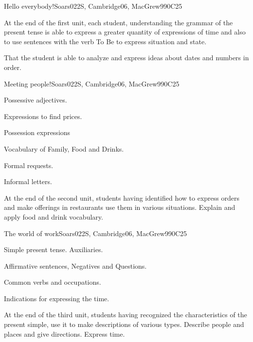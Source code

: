 \begin{syllabus}
\begin{unit}{Hello everybody!}{}{Soars022S, Cambridge06, MacGrew99}{0}{C25}
   \begin{learningoutcomes}
      \item At the end of the first unit, each student, understanding
            the grammar of the present tense is able to express a greater quantity of expressions of time and also to use sentences with the verb To Be to express situation and state.
      \item That the student is able to analyze and express ideas about dates and numbers in order. 
   \end{learningoutcomes}
\end{unit}

\begin{unit}{Meeting people!}{}{Soars022S, Cambridge06, MacGrew99}{0}{C25}
   \begin{topics}
      \item Possessive adjectives.
      \item Expressions to find prices.
      \item Possession expressions
      \item Vocabulary of Family, Food and Drinks.
      \item Formal requests.
      \item Informal letters.
   \end{topics}

   \begin{learningoutcomes}
      \item At the end of the second unit, students having identified how to express orders and make offerings in restaurants use them in various situations. Explain and apply food and drink vocabulary.
   \end{learningoutcomes}

\end{unit}

\begin{unit}{The world of work}{}{Soars022S, Cambridge06, MacGrew99}{0}{C25}
   \begin{topics}
      \item Simple present tense. Auxiliaries.
      \item Affirmative sentences, Negatives and Questions.
      \item Common verbs and occupations.
      \item Indications for expressing the time.
   \end{topics}

   \begin{learningoutcomes}
      \item At the end of the third unit, students having recognized the characteristics of the present simple, use it to make descriptions of various types. Describe people and places and give directions. Express time.
   \end{learningoutcomes}


\end{unit}
\end{syllabus}
